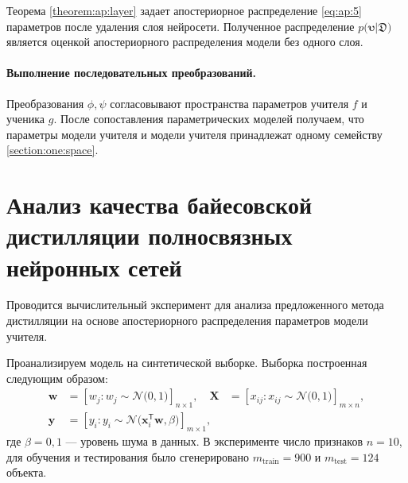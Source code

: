 Теорема \ref{theorem:ap:layer} задает апостериорное распределение \eqref{eq:ap:5} параметров после удаления слоя нейросети. Полученное распределение $p\bigr(\bm{\upsilon}|\mathfrak{D}\bigr) $ является оценкой апостериорного распределения модели без одного слоя.

\paragraph{Выполнение последовательных преобразований.}
Преобразования $\phi, \psi$ согласовывают пространства параметров учителя $f$ и ученика $g$. После сопоставления параметрических моделей получаем, что параметры модели учителя и модели учителя принадлежат одному семейству \ref{section:one:space}.

\section{Анализ качества байесовской дистилляции полносвязных нейронных сетей}
Проводится вычислительный эксперимент для анализа предложенного метода дистилляции на основе апостериорного распределения параметров модели учителя.

Проанализируем модель на синтетической выборке. Выборка построенная следующим образом:
\[
\label{eq:ex:1}
\begin{aligned}
\mathbf{w} &= \left[w_j: w_{j}\sim \mathcal{N}\bigr(0, 1\bigr)\right]_{n\times 1}, \quad \mathbf{X} &= \left[x_{ij}: x_{ij}\sim\mathcal{N}\bigr(0, 1\bigr)\right]_{m\times n}, \\
 \mathbf{y} &= \left[y_i: y_i \sim \mathcal{N}\bigr(\mathbf{x}_i^{\mathsf{T}}\mathbf{w}, \beta\bigr)\right]_{m \times 1},
\end{aligned}
\] 
где $\beta=0{,}1$ --- уровень шума в данных. В эксперименте число признаков $n=10$, для обучения и тестирования было сгенерировано $m_{\text{train}}=900$ и $m_{\text{test}}=124$ объекта.


